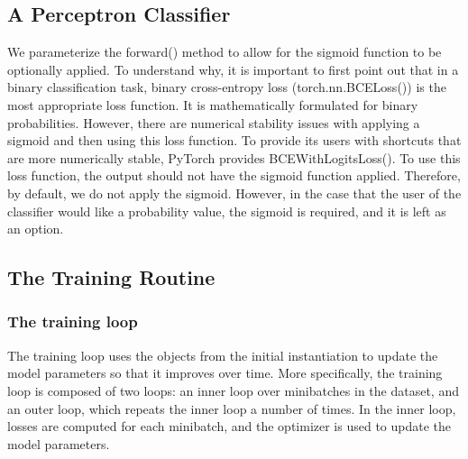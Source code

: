 \subsection{A Perceptron Classifier}
We parameterize the forward() method to allow for the sigmoid function to be
optionally applied. To understand why, it is important to first point out that in a
binary classification task, binary cross-entropy loss (\textsf{torch.nn.BCELoss()}) is the
most appropriate loss function. It is mathematically formulated for binary probabilities. However, there are numerical stability issues with applying a sigmoid and then
using this loss function. To provide its users with shortcuts that are more numerically
stable, PyTorch provides \textsf{BCEWithLogitsLoss()}. To use this loss function, the output
should not have the sigmoid function applied. Therefore, by default, we do not apply
the sigmoid. However, in the case that the user of the classifier would like a probability value, the sigmoid is required, and it is left as an option.
\subsection{The Training Routine}
\subsubsection*{The training loop}
The training loop uses the objects from the initial instantiation to update the model parameters so that it improves over time. More specifically, the training loop is composed of two loops: an inner loop over minibatches in the dataset, and an outer loop, which repeats the inner loop a number of times. In the inner loop, losses are computed for each minibatch, and the optimizer is used to update the model parameters.